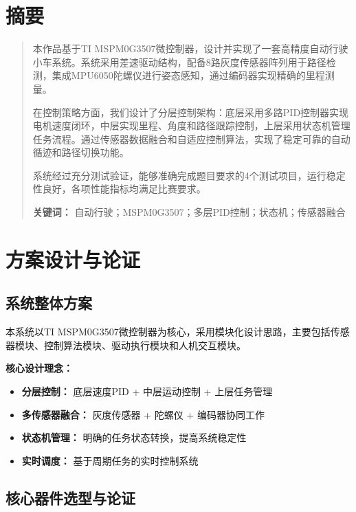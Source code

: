 \documentclass[UTF8]{ctexart}
\begin{document}
\section*{摘要}
\begin{quote}
    \noindent
    本作品基于TI MSPM0G3507微控制器，设计并实现了一套高精度自动行驶小车系统。系统采用差速驱动结构，配备8路灰度传感器阵列用于路径检测，集成MPU6050陀螺仪进行姿态感知，通过编码器实现精确的里程测量。
    
    在控制策略方面，我们设计了分层控制架构：底层采用多路PID控制器实现电机速度闭环，中层实现里程、角度和路径跟踪控制，上层采用状态机管理任务流程。通过传感器数据融合和自适应控制算法，实现了稳定可靠的自动循迹和路径切换功能。
    
    系统经过充分测试验证，能够准确完成题目要求的4个测试项目，运行稳定性良好，各项性能指标均满足比赛要求。

    \vspace{1cm}
    \noindent
    \textbf{关键词：} 自动行驶；MSPM0G3507；多层PID控制；状态机；传感器融合
\end{quote}

\newpage
\tableofcontents
\newpage

\section{方案设计与论证}

\subsection{系统整体方案}
    
本系统以TI MSPM0G3507微控制器为核心，采用模块化设计思路，主要包括传感器模块、控制算法模块、驱动执行模块和人机交互模块。

\textbf{核心设计理念：}
\begin{itemize}
    \item \textbf{分层控制：} 底层速度PID + 中层运动控制 + 上层任务管理
    \item \textbf{多传感器融合：} 灰度传感器 + 陀螺仪 + 编码器协同工作
    \item \textbf{状态机管理：} 明确的任务状态转换，提高系统稳定性
    \item \textbf{实时调度：} 基于周期任务的实时控制系统
\end{itemize}

\subsection{核心器件选型与论证}
\end{document}
